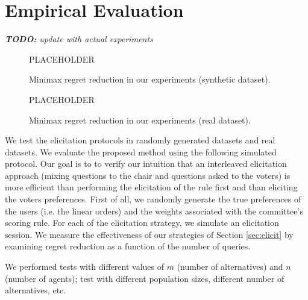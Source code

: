 \documentclass[12pt]{article}
\DeclareMathOperator{\MMR}{MMR}
\begin{document}

\section{Empirical Evaluation} \label{sec:experiments}

{\em {\bf TODO:} update with actual experiments}

\begin{figure}[t]
\begin{center}PLACEHOLDER\end{center}
\vspace{3.5cm}
\caption{Minimax regret reduction in our experiments (synthetic dataset).}
\end{figure}

\begin{figure}[t]
\begin{center}PLACEHOLDER\end{center}
\vspace{3.5cm}
\caption{Minimax regret reduction in our experiments (real dataset).}
\end{figure}

We test the elicitation protocols in randomly generated datasets and real datasets. %
We evaluate the proposed method using the following simulated protocol.
Our goal is to 
 to verify our intuition that an interleaved elicitation approach (mixing questions to the chair and questions asked to the voters) is more efficient than performing the elicitation of the rule first and than eliciting the voters preferences.
First of all, we randomly generate the true preferences of the users (i.e. the linear orders) and the weights associated with the committee's scoring rule.
For each of the elicitation strategy, we simulate an elicitation session.
We measure the effectiveness of our strategies of Section \ref{sec:elicit} by examining regret reduction as a function of the number of queries.

We performed tests with different values of $m$ (number of alternatives) and $n$ (number of agents); test with different population sizes, different number of alternatives, etc.
\end{document}

